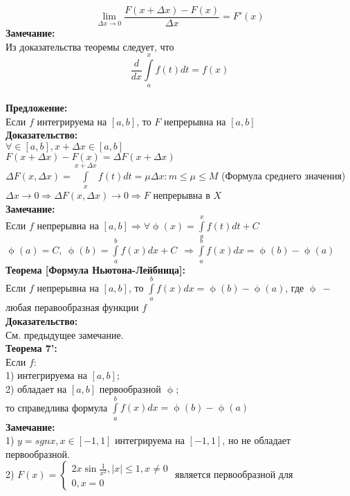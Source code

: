 \documentclass[a4paper,12pt]{article} %
\begin{document}
$$ \lim_{\Delta x  \rightarrow 0} \frac{F(x + \Delta x) - F(x) }{\Delta x} = F' (x)$$ 
\textbf{Замечание:}\\ [2mm]
Из доказательства теоремы следует, что
$$\frac{d}{dx} \int\limits_a^x f(t)dt = f(x)$$\\ [2mm]
\textbf{Предложение:} \\ [2mm]
Если $f$ интегрируема на $[a,b]$, то $F$ непрерывна на $[a,b]$\\ [2mm]
\textbf{Доказательство:} \\[2mm]
$\forall \in [a,b], x+\Delta x\in [a,b]$ \\ [2mm]
$F (x+ \Delta x ) - F(x) = \Delta F(x+\Delta x)$ \\[2mm]
$\Delta F(x, \Delta x) = \int\limits_x^{x + \Delta x} f(t)dt = \mu \Delta x : m \leq \mu \leq M $ (Формула среднего значения) \\[2mm]
$\Delta x \rightarrow 0 \Rightarrow \Delta F(x, \Delta x) \rightarrow 0 \Rightarrow F$ непрерывна в $X$ \\[2mm]
\textbf{Замечание:}\\[2mm]
Если $f$ непрерывна на $[a,b] \Rightarrow \forall \upphi(x) =\int\limits_a^{x} f(t)dt +C $\\ [2mm]
$\upphi(a) = C,~ \upphi(b)= \int\limits_a^{b} f(x)dx + C ~~\Rightarrow\int\limits_a^b f(x)dx = \upphi(b)-  \upphi(a) $\\ [2mm]
\textbf{Теорема [Формула Ньютона-Лейбница]:}\\ [2mm]
Если $f$ непрерывна на $[a,b]$, то $\int\limits_a^{b} f(x)dx = \upphi(b)-  \upphi(a) $, где $\upphi ~-~$ любая перавообразная функции $f$\\ [2mm]
\textbf{Доказательство:} \\[2mm]
См. предыдущее замечание.\\[2mm]
\textbf{Теорема 7':}\\[2mm]
Если $f$:\\[2mm]
1) интегрируема на $[a,b]$;\\[2mm]
2) обладает на $[a,b]$ первообразной $\upphi $;\\[2mm]
то справедлива формула $\int\limits_a^{b} f(x)dx = \upphi(b)-  \upphi(a) $\\[2mm]
\textbf{Замечание:}\\[2mm]
1) $y = sgn x, x \in [-1,1]$ интегрируема на $[-1,1]$, но не обладает первообразной.\\[2mm]
2) $F(x)= \begin {cases} 2x \sin \frac{1}{x^2}, |x|\leq 1, x \neq 0\\ 0, x = 0
\end{cases}$ является первообразной для \\[2mm]
\end{document}
